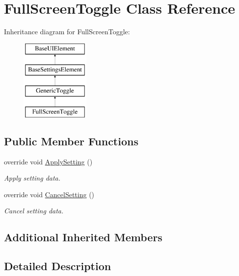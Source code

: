 \hypertarget{class_full_screen_toggle}{}\section{Full\+Screen\+Toggle Class Reference}
\label{class_full_screen_toggle}
Inheritance diagram for Full\+Screen\+Toggle\+:\begin{figure}[H]
\begin{center}
\leavevmode
\includegraphics[height=4.000000cm]{class_full_screen_toggle}
\end{center}
\end{figure}
\subsection*{Public Member Functions}
\begin{DoxyCompactItemize}
\item 
override void \hyperlink{class_full_screen_toggle_ae4c6b14c9e106e2d2749b28808a9bd6c}{Apply\+Setting} ()
\begin{DoxyCompactList}\small\item\em Apply setting data. \end{DoxyCompactList}\item 
override void \hyperlink{class_full_screen_toggle_a6f9140dc1331393df37ad10944831eae}{Cancel\+Setting} ()
\begin{DoxyCompactList}\small\item\em Cancel setting data. \end{DoxyCompactList}\end{DoxyCompactItemize}
\subsection*{Additional Inherited Members}


\subsection{Detailed Description}


